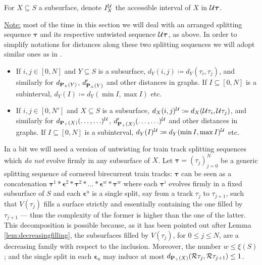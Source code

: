 For $X\subseteq S$ a subsurface, denote $I_X^{\mathcal U}$ the accessible interval of $X$ in ${\mathcal U}\bm\tau$.

\ul{Note:} most of the time in this section we will deal with an arranged splitting sequence $\bm\tau$ and its respective untwisted sequence ${\mathcal U}\bm\tau$, as above. In order to simplify notations for distances along these two splitting sequences we will adopt similar ones as in \cite{mms}.
\begin{itemize}
\item If $i,j\in [0,N]$ and $Y\subseteq S$ is a subsurface, $d_Y(i,j)\coloneqq d_Y(\tau_i,\tau_j)$, and similarly for $d_{{\mathbf{P}_+}(Y)}$, $d'_{{\mathbf{P}_+}(Y)}$ and other distances in graphs. If $I\subseteq [0,N]$ is a subinterval, $d_Y(I)\coloneqq d_Y(\min I, \max I)$ etc.
\item If $i,j\in [0,N']$ and $X\subseteq S$ is a subsurface, $d_X(i,j)^{\mathcal U}\coloneqq d_X({\mathcal U}\tau_i,{\mathcal U}\tau_j)$, and similarly for $d_{{\mathbf{P}_+}(X)}(\ldots,\ldots)^{\mathcal U}$, $d'_{{\mathbf{P}_+}(X)}(\ldots,\ldots)^{\mathcal U}$ and other distances in graphs. If $I\subseteq [0,N]$ is a subinterval, $d_Y(I)^{\mathcal U}\coloneqq d_Y(\min I, \max I)^{\mathcal U}$ etc.
\end{itemize}

In a bit we will need a version of untwisting for train track splitting sequences which \emph{do not} evolve firmly in any subsurface of $X$. Let $\bm\tau=(\tau_j)_{j=0}^N$ be a generic splitting sequence of cornered birecurrent train tracks: $\bm\tau$ can be seen as a concatenation $\bm\tau^1*\bm\epsilon^2*\bm\tau^2*\ldots*\bm\epsilon^w*\bm\tau^w$ where each $\bm\tau^i$ evolves firmly in a fixed subsurface of $S$ and each $\bm\epsilon^u$ is a single split, say from a track $\tau_j$ to $\tau_{j+1}$, such that $V(\tau_j)$ fills a surface strictly and essentially containing the one filled by $\tau_{j+1}$ --- thus the complexity of the former is higher than the one of the latter. This decomposition is possible because, as it has been pointed out after Lemma \ref{lem:decreasingfilling}, the subsurfaces filled by $V(\tau_j)$, for $0\leq j\leq N$, are a decreasing family with respect to the inclusion. Moreover, the number $w\leq \xi(S)$; and the single split in each $\bm\epsilon_u$ may induce at most $d_{{\mathbf{P}_+}(X)}({\mathcal R}\tau_j,{\mathcal R}\tau_{j+1})\leq 1$.

